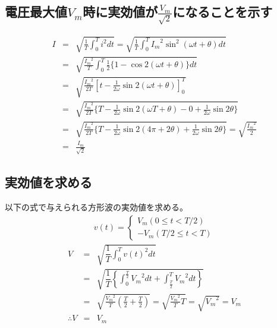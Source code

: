 \documentclass[dvipdfmx]{jsarticle}
\begin{document}
\subsection{電圧最大値$V_m$時に実効値が$\frac{V_m}{\sqrt{2}}$になることを示す}
\begin{eqnarray}
  I & = & \sqrt{\frac{1}{T} \int_0^T i^2 dt} = \sqrt{\frac{1}{T} \int_0^T {I_m}^2\sin^2(\omega t + \theta) dt}\nonumber \\
 & = &\sqrt{\frac{{I_m}^2}{T} \int_0^T \frac{1}{2} \{1 - \cos2(\omega t + \theta)\} dt}\nonumber \\
 & = & \sqrt{\frac{{I_m}^2}{2T} \left[t - \frac{1}{2\omega}\sin2(\omega t + \theta)\right]_0^T}\nonumber \\
 & = & \sqrt{\frac{{I_m}^2}{2T} \{T - \frac{1}{2\omega}\sin2(\omega T + \theta) - 0 + \frac{1}{2\omega}\sin2\theta\}}\nonumber \\
 & = & \sqrt{\frac{{I_m}^2}{2T} \{T - \frac{1}{2\omega}\sin2(4\pi + 2\theta) + \frac{1}{2\omega}\sin2\theta\}} = \sqrt{\frac{{I_m}^2}{2}}\nonumber  \\
 & = & \frac{I_m}{\sqrt{2}}\nonumber 
\end{eqnarray}

\subsection{実効値を求める}
以下の式で与えられる方形波の実効値を求める。
\begin{eqnarray*}
  v(t) = 
  \begin{cases}
    V_m (0\leq t < T/2)\\
    -V_m (T/2 \leq t < T)
  \end{cases}
\end{eqnarray*}
\begin{eqnarray*}
  V & = & \sqrt {\dfrac {1}{T}\int ^{T}_{0}v\left( t\right) ^{2}dt} \\
  & = & \sqrt {\dfrac {1}{T}\left\{ \int ^{\frac{T}{2}}_{0}{V_m}^2 dt+\int ^{T}_{\frac {T}{2}}{V_m}^2 dt\right\} }\\
  & = & \sqrt{\frac{{V_m}^2}{T} (\frac{T}{2} + \frac{T}{2})} = \sqrt{\frac{{V_m}^2}{T} T} = \sqrt{{V_m}^2} = V_m\\
  \therefore V & = & V_m
\end{eqnarray*}
\end{document}
